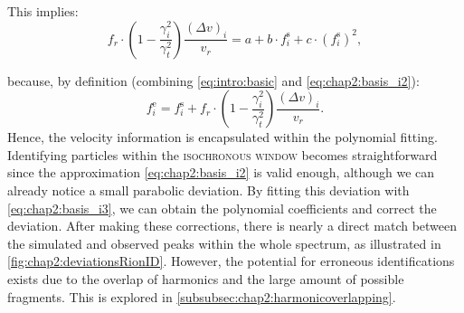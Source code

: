 This implies:
\begin{equation} 
    f_{r} \cdot\left(1-\frac{\gamma_{i}^{2}}{\gamma_{t}^{2}}\right)\frac{\left(\Delta v\right)_{i}} {v_{r}} = a + b\cdot f^{\mathrm{s}}_{i} + c \cdot \left(f^{\mathrm{s}}_{i}\right)^2,
    \label{eq:chap2:basis_i5} 
    \end{equation}

because, by definition (combining \cref{eq:intro:basic} and \cref{eq:chap2:basis_i2}):
\begin{equation} 
    f^{\mathrm{e}}_{i} = f^{\mathrm{s}}_{i} + f_{r} \cdot\left(1-\frac{\gamma_{i}^{2}}{\gamma_{t}^{2}}\right)\frac{\left(\Delta v\right)_{i}}{v_{r}}.
    \label{eq:chap2:basis_i4} 
\end{equation}
Hence, the velocity information is encapsulated within the polynomial fitting.
\newpar
Identifying particles within the \textsc{isochronous window} becomes straightforward since the approximation \cref{eq:chap2:basis_i2} is valid enough, although we can already notice a small parabolic deviation.  By fitting this deviation with \cref{eq:chap2:basis_i3}, we can obtain the polynomial coefficients and correct the deviation. After making these corrections, there is nearly a direct match between the simulated and observed peaks within the whole spectrum, as illustrated in \cref{fig:chap2:deviationsRionID}. However, the potential for erroneous identifications exists due to the overlap of harmonics and the large amount of possible fragments. This is explored in \cref{subsubsec:chap2:harmonicoverlapping}.

